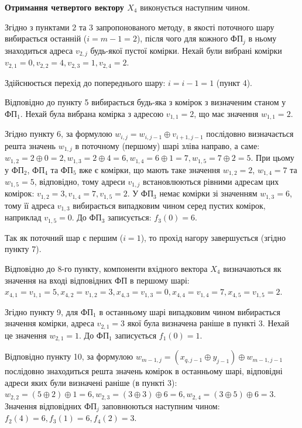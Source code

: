 \documentclass[12pt]{article}
\begin{document}
\textbf{Отримання четвертого вектору $X_4$} виконується наступним чином.

Згідно з пунктами 2 та 3 запропонованого методу, в якості поточного шару вибирається останній ($i = m - 1 = 2$), після чого для кожного ФП$_j$ в ньому знаходиться адреса $v_{2, j}$ будь-якої пустої комірки. Нехай були вибрані комірки $v_{2,1}=0, v_{2,2}=4, v_{2,3}=1, v_{2,4}=2$.

Здійснюється перехід до попереднього шару: $i = i - 1 = 1$ (пункт 4).

Відповідно до пункту 5 вибирається будь-яка з комірок з визначеним станом у ФП$_1$.
Нехай була вибрана комірка з адресою $v_{1,1}=2$, що має значення $w_{1,1}=2$.

Згідно пункту 6, за формулою $w_{i,j} = w_{i,j-1} \oplus v_{i+1,j-1}$ послідовно визначається решта значень $w_{1,j}$ в поточному (першому) шарі зліва направо, а саме: $w_{1,2} = 2 \oplus 0 = 2, w_{1,3} = 2 \oplus 4 = 6, w_{1,4} = 6 \oplus 1 = 7, w_{1,5} = 7 \oplus 2 = 5$.
При цьому у ФП$_2$, ФП$_4$ та ФП$_5$ вже є комірки, що мають таке значення $w_{1,2}=2$, $w_{1,4}=7$ та $w_{1,5}=5$, відповідно, тому адреси $v_{1,j}$ встановлюються рівними адресам цих комірок: $v_{1,2} = 3, v_{1,4} = 7, v_{1,5} = 2$. У ФП$_3$ немає комірки зі значенням $w_{1,3}=6$, тому її адреса $v_{1,3}$ вибирається випадковим чином серед пустих комірок, наприклад $v_{1,5}=0$. До ФП$_3$ записується: $f_3(0)=6$.

Так як поточний шар є першим ($i=1$), то прохід нагору завершується (згідно пункту 7).

Відповідно до 8-го пункту, компоненти вхідного вектора $X_4$ визначаються як значення на вході відповідних ФП в першому шарі: $x_{4,1}=v_{1,1}=5, x_{4,2}=v_{1,2}=3, x_{4,3}=v_{1,3}=0, x_{4,4}=v_{1,4}=7, x_{4,5}=v_{1,5}=2$.

Згідно пункту 9, для ФП$_1$ в останньому шарі випадковим чином вибирається значення комірки, адреса $v_{2,1}=3$ якої  була визначена раніше в пункті 3. Нехай це значення $w_{2,1}=1$. До ФП$_1$ записується $f_1(0)=1$.

Відповідно пункту 10, за формулою $w_{m-1,j}=(x_{q,j-1} \oplus y_{j-1}) \oplus w_{m-1,j-1}$ послідовно знаходиться решта значень комірок в останньому шарі, відповідні адреси яких були визначені раніше (в пункті 3): $w_{2,2} = (5 \oplus 2) \oplus 1 = 6, w_{2,3} = (3 \oplus 3) \oplus 6 = 6, w_{2,4} = (3 \oplus 5) \oplus 6 = 3$. Значення відповідних ФП$_j$ заповнюються наступним чином: $f_2(4)=6, f_3(1)=6, f_4(2)=3$.
\end{document}
